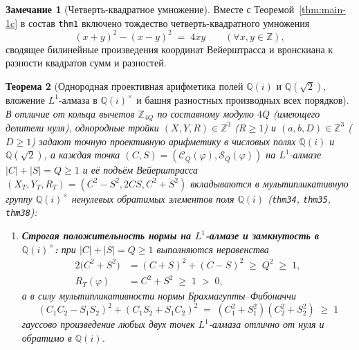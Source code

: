 \documentclass[11pt,a4paper]{article}
\theoremstyle{plain}
\newtheorem{theorem}{Теорема}[section]
\theoremstyle{definition}
\newtheorem{remark}[theorem]{Замечание}
\begin{document}
\begin{remark}[Четверть-квадратное умножение]
\label{rem:quarter-square}
Вместе с Теоремой~\ref{thm:main-1c} в состав \texttt{thm1} включено тождество четверть-квадратного умножения
\begin{equation}
  \label{eq:quarter-square-mul}
  (x + y)^2 - (x - y)^2 \;=\; 4xy \qquad (\forall x, y \in \mathbb{Z}),
\end{equation}
сводящее билинейные произведения координат Вейерштрасса и вронскиана к разности квадратов сумм и разностей.
\end{remark}

\begin{theorem}[Однородная проективная арифметика полей $\mathbb{Q}(i)$ и $\mathbb{Q}(\sqrt{2})$, вложение $L^1$-алмаза в $\mathbb{Q}(i)^\times$ и башня разностных производных всех порядков]
\label{thm:main-34-field}
В отличие от кольца вычетов $\mathbb{Z}_{4Q}$ по составному модулю $4Q$ (имеющего делители нуля), однородные тройки $(X, Y, R) \in \mathbb{Z}^3$ ($R \ge 1$) и $(a, b, D) \in \mathbb{Z}^3$ ($D \ge 1$) задают точную проективную арифметику в числовых полях $\mathbb{Q}(i)$ и $\mathbb{Q}(\sqrt{2})$, а каждая точка $(C, S) = (\mathcal{C}_Q(\varphi), \mathcal{S}_Q(\varphi))$ на $L^1$-алмазе $|C| + |S| = Q \ge 1$ и её подъём Вейерштрасса $(X_T, Y_T, R_T) = (C^2 - S^2, 2CS, C^2 + S^2)$ вкладываются в мультипликативную группу $\mathbb{Q}(i)^\times$ ненулевых обратимых элементов поля $\mathbb{Q}(i)$ (\texttt{thm34}, \texttt{thm35}, \texttt{thm38}):
\begin{enumerate}[label=\textbf{(\roman*)},leftmargin=*]
\item \textbf{Строгая положительность нормы на $L^1$-алмазе и замкнутость в $\mathbb{Q}(i)^\times$:}
  при $|C| + |S| = Q \ge 1$ выполняются неравенства
  \begin{align}
    2\bigl(C^2 + S^2\bigr) &= (C + S)^2 + (C - S)^2 \;\ge\; Q^2 \;\ge\; 1, \label{eq:diamond-norm-positivity} \\
    R_T(\varphi) &= C^2 + S^2 \;\ge\; 1 \;>\; 0, \label{eq:weierstrass-denom-pos}
  \end{align}
  а в силу мультипликативности нормы Брахмагупты--Фибоначчи
  \begin{equation}
    \label{eq:brahmagupta-no-zero-divisors}
    (C_1 C_2 - S_1 S_2)^2 + (C_1 S_2 + S_1 C_2)^2 \;=\; (C_1^2 + S_1^2)(C_2^2 + S_2^2) \;\ge\; 1
  \end{equation}
  гауссово произведение любых двух точек $L^1$-алмаза отлично от нуля и обратимо в $\mathbb{Q}(i)$.


\end{enumerate}
\end{theorem}
\end{document}
